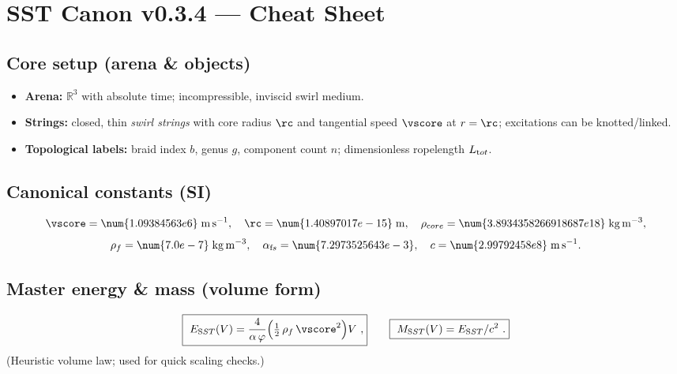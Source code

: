 \documentclass[11pt]{article}
\begin{document}

\section*{SST Canon v0.3.4 — Cheat Sheet}

    \subsection*{Core setup (arena \& objects)}
        \begin{itemize}
        \item \textbf{Arena:} $\mathbb{R}^3$ with absolute time; incompressible, inviscid swirl medium.
        \item \textbf{Strings:} closed, thin \emph{swirl strings} with core radius $\rc$ and tangential speed $\vscore$ at $r=\rc$; excitations can be knotted/linked.
        \item \textbf{Topological labels:} braid index $b$, genus $g$, component count $n$; dimensionless ropelength $L_{\textrm tot}$.
        \end{itemize}

    \subsection*{Canonical constants (SI)}
        \[
            \vscore=\num{1.09384563e6}\;\mathrm{m\,s^{-1}},\quad
            \rc=\num{1.40897017e-15}\;\mathrm{m},\quad
            \rho_{\textrm core}=\num{3.8934358266918687e18}\;\mathrm{kg\,m^{-3}},
        \]
        \[
            \rho_f=\num{7.0e-7}\;\mathrm{kg\,m^{-3}},\quad
            \alpha_{\textrm fs}=\num{7.2973525643e-3},\quad
            c=\num{2.99792458e8}\;\mathrm{m\,s^{-1}}.
        \]

    \subsection*{Master energy \& mass (volume form)}
        \[
            \boxed{~E_{\textrm SST}(V)=\frac{4}{\alpha\,\varphi}\Big(\tfrac12\,\rho_f\,\vscore^2\Big)V~,}
            \qquad
            \boxed{~M_{\textrm SST}(V)=E_{\textrm SST}/c^2~.}
        \]
        (Heuristic volume law; used for quick scaling checks.)
\end{document}
